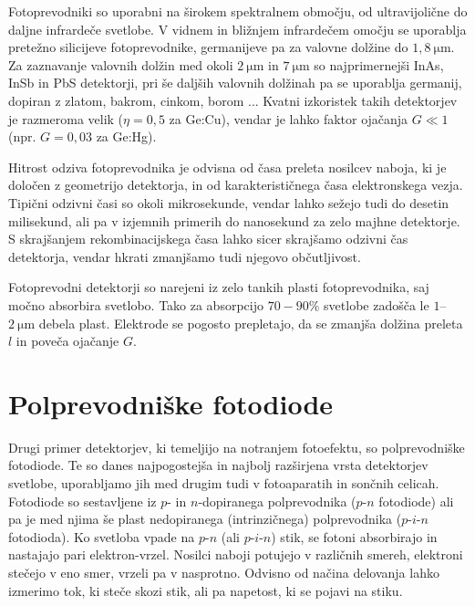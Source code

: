 Fotoprevodniki so uporabni na širokem spektralnem območju, od ultra\-vijolične 
do daljne infra\-rdeče svetlobe. V vidnem in bližnjem infrardečem omočju se 
uporablja pretežno silicijeve fotoprevodnike, germanijeve
pa za valovne dolžine do $1,8~\si{\micro\meter}$. Za zaznavanje valovnih dolžin med okoli 
$2~\si{\micro\meter}$ in $7~\si{\micro\meter}$ so najprimernejši InAs, InSb in PbS detektorji, 
pri še daljših valovnih dolžinah pa se uporablja germanij, dopiran z zlatom, bakrom, cinkom, borom ...
Kvatni izkoristek takih detektorjev je razmeroma velik ($\eta = 0,5$ za Ge:Cu), vendar
je lahko faktor ojačanja $G \ll 1$ (npr. $G = 0,03$ za Ge:Hg). 

Hitrost odziva fotoprevodnika je odvisna od časa preleta nosilcev naboja,
ki je določen z geometrijo detektorja, in od karakterističnega časa elektronskega vezja. 
Tipični odzivni časi so okoli mikrosekunde, vendar lahko sežejo
tudi do desetin milisekund, ali pa v izjemnih primerih do nanosekund za zelo majhne detektorje.
S skrajšanjem rekombinacijskega časa lahko sicer skrajšamo odzivni čas detektorja, 
vendar hkrati zmanjšamo tudi njegovo občutljivost.

\begin{remark}
Fotoprevodni detektorji so narejeni iz zelo tankih plasti fotoprevodnika, saj močno absorbira
svetlobo. Tako za absorpcijo $70-90\%$ svetlobe zadošča le $1$--$2~\si{\micro\meter}$ debela plast.
Elektrode se pogosto prepletajo, da se zmanjša dolžina preleta $l$ in poveča ojačanje $G$. 
\end{remark}

\section{Polprevodniške fotodiode}
Drugi primer detektorjev, ki temeljijo na notranjem fotoefektu, so polprevodniške fotodiode.
Te so danes najpogostejša in najbolj razširjena vrsta detektorjev svetlobe, uporabljamo jih med
drugim tudi v fotoaparatih in sončnih celicah. Fotodiode so sestavljene iz $p$- in $n$-dopiranega 
polprevodnika ($p$-$n$ fotodiode) ali pa je med njima še plast nedopiranega (intrinzičnega) 
polprevodnika ($p$-$i$-$n$ fotodioda). Ko svetloba vpade na $p$-$n$ (ali $p$-$i$-$n$) 
stik, se fotoni absorbirajo in nastajajo 
pari elektron-vrzel. Nosilci naboji potujejo v različnih smereh, elektroni stečejo v eno smer,
vrzeli pa v nasprotno. Odvisno od načina delovanja lahko izmerimo tok, ki steče skozi 
stik, ali pa napetost, ki se pojavi na stiku. 

